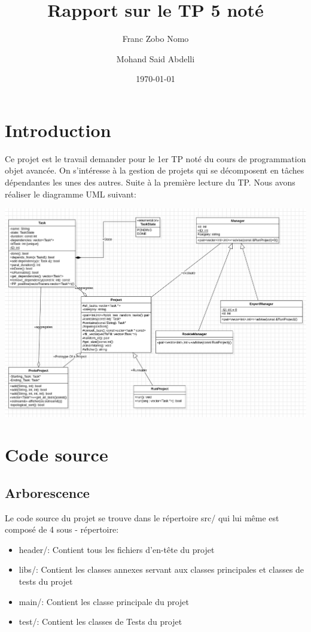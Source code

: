 \documentclass[paper=a4, fontsize=11pt, frenchb, englishb]{article}
\author{Franc Zobo Nomo \and Mohand Said Abdelli}
\title{Rapport sur le TP 5 noté}
\date{\today}
\begin{document}
	\maketitle
	\tableofcontents
	
	\section{Introduction}
	
Ce projet est le travail demander pour le 1er TP noté du cours de programmation objet avancée. On s’intéresse à la gestion de projets qui se décomposent en tâches dépendantes les unes des autres. Suite à la première lecture du TP. Nous avons réaliser le diagramme UML suivant:

\begin{center}
	\includegraphics[width=\linewidth]{diagramme-uml.png}
	\label{diag}
\end{center}
	
	\section{Code source}
	
		\subsection{Arborescence}
		
Le code source du projet se trouve dans le répertoire src/ qui lui même est composé de 4 sous - répertoire:

\begin{itemize}
	\item header/: Contient tous les fichiers d'en-tête du projet
	\item libs/: Contient les classes annexes servant aux classes principales et classes de tests du projet
	\item main/: Contient les classe principale du projet
	\item test/: Contient les classes de Tests du projet
\end{itemize}
\end{document}
